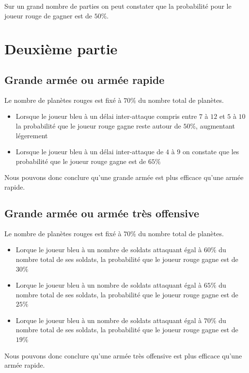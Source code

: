 \documentclass{article}
\begin{document}
    Sur un grand nombre de parties on peut constater que la probabilité pour le
    joueur rouge de gagner est de $50\%$.

  \section*{Deuxième partie}

    \subsection*{Grande armée ou armée rapide}

      \noindent
      Le nombre de planètes rouges est fixé à $70\%$ du nombre total de
      planètes.

      \begin{itemize}
        \item Lorsque le joueur bleu à un délai inter-attaque compris entre $7$
          à $12$ et $5$ à $10$ la probabilité que le joueur rouge gagne reste
          autour de $50\%$, augmentant légerement
        \item Lorsque le joueur bleu à un délai inter-attaque de $4$ à $9$ on
          constate que les probabilité que le joueur rouge gagne est de
          $65\%$
      \end{itemize}

      \medskip
      Nous pouvons donc conclure qu'une grande armée est plus efficace qu'une
      armée rapide.


    \subsection*{Grande armée ou armée très offensive}

      \noindent
      Le nombre de planètes rouges est fixé à $70\%$ du nombre total de
      planètes.

      \begin{itemize}
        \item Lorque le joueur bleu à un nombre de soldats attaquant égal à
      $60\%$ du nombre total de ses soldats, la probabilité que le joueur rouge
          gagne est de $30\%$
        \item Lorque le joueur bleu à un nombre de soldats attaquant égal à
      $65\%$ du nombre total de ses soldats, la probabilité que le joueur rouge
          gagne est de $25\%$
        \item Lorque le joueur bleu à un nombre de soldats attaquant égal à
      $70\%$ du nombre total de ses soldats, la probabilité que le joueur rouge
          gagne est de $19\%$
      \end{itemize}

      \medskip
      Nous pouvons donc conclure qu'une armée très offensive est plus efficace
      qu'une armée rapide. 
\end{document}
